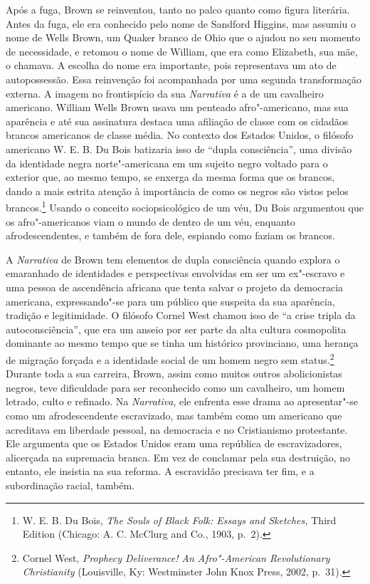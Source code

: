 Após a fuga, Brown se reinventou, tanto no palco quanto como figura
literária. Antes da fuga, ele era conhecido pelo nome de Sandford
Higgins, mas assumiu o nome de Wells Brown, um Quaker branco de Ohio que
o ajudou no seu momento de necessidade, e retomou o nome de William, que
era como Elizabeth, sua mãe, o chamava. A escolha do nome era
importante, pois representava um ato de autopossessão. Essa reinvenção
foi acompanhada por uma segunda transformação externa. A imagem no
frontispício da sua \emph{Narrativa} é a de um cavalheiro americano.
William Wells Brown usava um penteado afro"-americano, mas sua aparência
e até sua assinatura destaca uma afiliação de classe com os cidadãos
brancos americanos de classe média. No contexto dos Estados Unidos, o
filósofo americano W. E. B. Du Bois batizaria isso de ``dupla
consciência'', uma divisão da identidade negra norte"-americana em um
sujeito negro voltado para o exterior que, ao mesmo tempo, se enxerga da
mesma forma que os brancos, dando a mais estrita atenção à importância
de como os negros são vistos pelos brancos.\footnote{W. E. B. Du Bois,
  \emph{The Souls of Black Folk: Essays and Sketches,} Third Edition
  (Chicago: A. C. McClurg and Co., 1903, p.~2).} Usando o conceito
sociopsicológico de um véu, Du Bois argumentou que os afro"-americanos
viam o mundo de dentro de um véu, enquanto afrodescendentes, e também de
fora dele, espiando como faziam os brancos.

A \emph{Narrativa} de Brown tem elementos de dupla consciência quando
explora o emaranhado de identidades e perspectivas envolvidas em ser um
ex"-escravo e uma pessoa de ascendência africana que tenta salvar o
projeto da democracia americana, expressando"-se para um público que
suspeita da sua aparência, tradição e legitimidade. O filósofo Cornel
West chamou isso de ``a crise tripla da autoconsciência'', que era um
anseio por ser parte da alta cultura cosmopolita dominante ao mesmo
tempo que se tinha um histórico provinciano, uma herança de migração
forçada e a identidade social de um homem negro sem status.\footnote{Cornel
  West, \emph{Prophecy Deliverance!} \emph{An Afro"-American
  Revolutionary Christianity} (Louisville, Ky: Westminster John Knox
  Press, 2002, p.~31).} Durante toda a sua carreira, Brown, assim como
muitos outros abolicionistas negros, teve dificuldade para ser
reconhecido como um cavalheiro, um homem letrado, culto e refinado. Na
\emph{Narrativa}, ele enfrenta esse drama ao apresentar"-se como um
afrodescendente escravizado, mas também como um americano que acreditava
em liberdade pessoal, na democracia e no Cristianismo protestante. Ele
argumenta que os Estados Unidos eram uma república de escravizadores,
alicerçada na supremacia branca. Em vez de conclamar pela sua
destruição, no entanto, ele insistia na sua reforma. A escravidão
precisava ter fim, e a subordinação racial, também.

